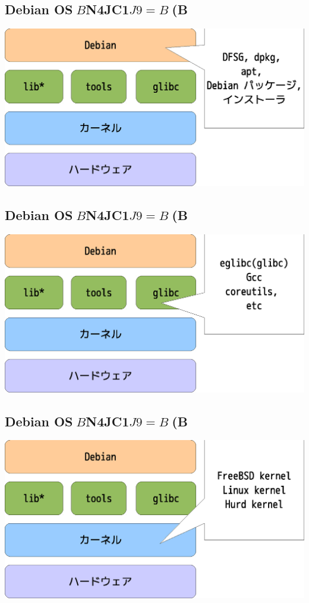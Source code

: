 \documentclass[mingoth,a4paper]{jsarticle}
\begin{document}
{{{{{{{{{{{{{\subsection{Debian OS$B$N4JC1$J9=B$(B}
\includegraphics[width=1.0\hsize]{image201006/os-block01-1.eps}



\subsection{Debian OS$B$N4JC1$J9=B$(B}
\includegraphics[width=1.0\hsize]{image201006/os-block01-2.eps}



\subsection{Debian OS$B$N4JC1$J9=B$(B}
\includegraphics[width=1.0\hsize]{image201006/os-block01-3.eps}


}}}}}}}}}}}}}
\end{document}
